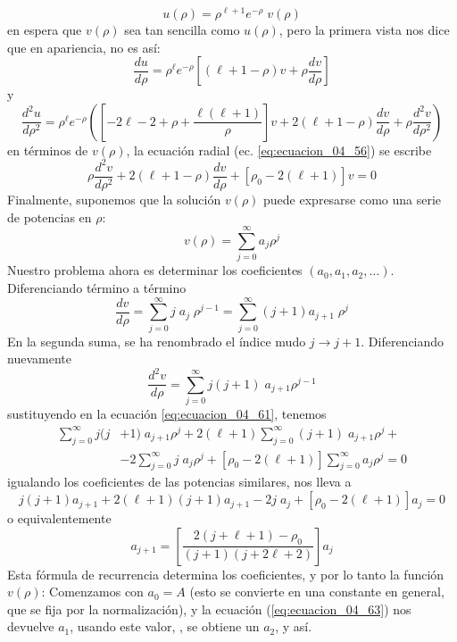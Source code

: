 \begin{equation}
u(\rho) = \rho^{\ell + 1} e^{-\rho} \; v(\rho)
\label{eq:ecuacion_04_60} 
\end{equation}
en espera que $v(\rho)$ sea tan sencilla como $u(\rho)$, pero la primera vista nos dice que en apariencia, no es así:
\[ \dfrac{d u}{d \rho} = \rho^{\ell} e^{-\rho} \left[ (\ell + 1 - \rho) v + \rho \dfrac{d v}{d \rho} \right]  \]
y
\[ \dfrac{d^{2} u}{d \rho^{2}} = \rho^{\ell} e^{-\rho} \left( \left[ -2 \ell - 2 + \rho + \dfrac{ \ell (\ell + 1)}{\rho} \right] v + 2 (\ell + 1 - \rho) \dfrac{d v}{d \rho} + \rho \dfrac{d^{2} v}{d \rho^{2}} \right)  \]
en términos de $v(\rho)$, la ecuación radial (ec. \ref{eq:ecuacion_04_56}) se escribe
\begin{equation}
\rho \dfrac{d^{2} v}{d \rho^{2}} + 2 (\ell + 1 - \rho) \dfrac{d v}{d \rho} + [\rho_{0} - 2 (\ell + 1)] v = 0
\label{eq:ecuacion_04_61}
\end{equation}
Finalmente, suponemos que la solución $v(\rho)$ puede expresarse como una serie de potencias en $\rho$:
\begin{equation}
v(\rho) = \sum_{j=0}^{\infty} a_{j} \rho^{j} 
\label{eq:ecuacion_04_62}
\end{equation}
Nuestro problema ahora es determinar los coeficientes $(a_{0}, a_{1}, a_{2}, \ldots)$. Diferenciando término a término
\[ \dfrac{d v}{d \rho} = \sum_{j=0}^{\infty} j \; a_{j} \; \rho^{j - 1} = \sum_{j=0}^{\infty} (j+1) a_{j+1} \; \rho^{j} \]
En la segunda suma, se ha renombrado el índice mudo $j \to j+1$. Diferenciando nuevamente
\[ \dfrac{d^{2} v}{d \rho} = \sum_{j=0}^{\infty} j (j+1) \; a_{j+1} \rho^{j-1} \]
sustituyendo en la ecuación \ref{eq:ecuacion_04_61}, tenemos
\[ \begin{split}
\sum_{j=0}^{\infty} j (j &+ 1)\; a_{j+1} \rho^{j} + 2 (\ell + 1) \sum_{j=0}^{\infty} (j + 1) \; a_{j+1} \rho^{j} + \\
&- 2 \sum_{j=0}^{\infty} j \; a_{j} \rho^{j} + [ \rho_{0} - 2(\ell + 1)] \sum_{j=0}^{\infty} a_{j} \rho^{j} = 0
\end{split} \]
igualando los coeficientes de las potencias similares, nos lleva a
\[ j(j+1)a_{j+1} + 2(\ell + 1)(j + 1) a_{j+1} - 2 j \; a_{j} + [\rho_{0} - 2(\ell + 1)] a_{j} = 0 \]
o equivalentemente
\begin{equation}
a_{j+1} = \left[ \dfrac{2(j + \ell + 1) - \rho_{0}}{(j+1)(j + 2 \ell + 2)} \right] a_{j}
\label{eq:ecuacion_04_63}
\end{equation}
Esta fórmula de recurrencia determina los coeficientes, y por lo tanto la función $v(\rho)$: Comenzamos con $a_{0}= A$ (esto se convierte en una constante en general, que se fija por la normalización), y la ecuación (\ref{eq:ecuacion_04_63}) nos devuelve $a_{1}$, usando este valor, , se obtiene un $a_{2}$, y así.
